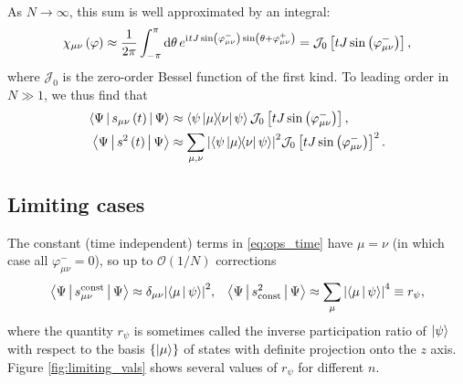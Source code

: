 \documentclass[nofootinbib,notitlepage,11pt]{revtex4-2}
\renewcommand{\t}{\text} %
\newcommand{\f}[2]{\dfrac{#1}{#2}} %
\newcommand{\p}[1]{\left(#1\right)} %
\renewcommand{\sp}[1]{\left[#1\right]} %
\renewcommand{\set}[1]{\left\{#1\right\}} %
\newcommand{\bk}{\Braket} %
\renewcommand{\dd}{\text{d}} %
\renewcommand{\i}{\mathrm{i}\mkern1mu} %
\newcommand{\1}{\mathds{1}}
\newcommand{\J}{\mathcal{J}}
\renewcommand{\O}{\mathcal{O}}
\begin{document}
As $N\to\infty$, this sum is well approximated by an integral:
\begin{align}
  \chi_{\mu\nu}\p{\varphi} \approx \f1{2\pi} \int_{-\pi}^\pi \dd\theta\,
  e^{\i tJ\sin\p{\varphi_{\mu\nu}^-} \sin\p{\theta+\varphi_{\mu\nu}^+}}
  = \J_0\sp{tJ\sin\p{\varphi_{\mu\nu}^-}},
\end{align}
where $\J_0$ is the zero-order Bessel function of the first kind.
To leading order in $N\gg1$, we thus find that
\begin{align}
  \bk{\Psi|s_{\mu\nu}\p{t}|\Psi}
  &\approx \bk{\psi\op{\mu}{\nu}\psi}
  \J_0\sp{tJ\sin\p{\varphi_{\mu\nu}^-}},
  \\
  \bk{\Psi|s^2\p{t}|\Psi}
  &\approx \sum_{\mu,\nu} \abs{\bk{\psi\op{\mu}{\nu}\psi}}^2
  \J_0\sp{tJ\sin\p{\varphi_{\mu\nu}^-}}^2.
  \label{eq:ops_time}
\end{align}

\subsection{Limiting cases}

The constant (time independent) terms in \eqref{eq:ops_time} have $\mu=\nu$ (in which case all $\varphi_{\mu\nu}^-=0$), so up to $\O(1/N)$ corrections
\begin{align}
  \bk{\Psi|s_{\mu\nu}^{\t{const}}|\Psi}
  \approx \delta_{\mu\nu} \abs{\bk{\mu|\psi}}^2,
  &&
  \bk{\Psi|s^2_{\t{const}}|\Psi}
  \approx \sum_\mu \abs{\bk{\mu|\psi}}^4 \equiv r_\psi,
  \label{eq:ops_const}
\end{align}
where the quantity $r_\psi$ is sometimes called the inverse participation ratio of $\ket\psi$ with respect to the basis $\set{\ket\mu}$ of states with definite projection onto the $z$ axis.
Figure \ref{fig:limiting_vals} shows several values of $r_\psi$ for different $n$.
\end{document}
